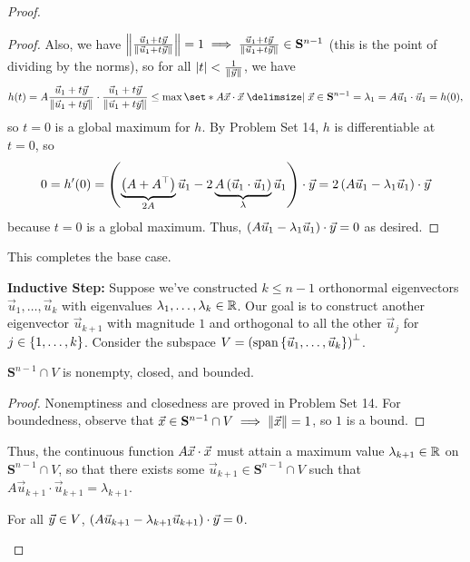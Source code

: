\documentclass[main.tex]{subfiles}
\begin{document}
\begin{proof}
\begin{proof}
        Also, we have $\left\lVert \frac{\vec{u}_1 + t\vec{y}}{\left\lVert \vec{u}_1 + t\vec{y} \right\rVert} \right\rVert = 1\implies \frac{\vec{u}_1 + t\vec{y}}{\left\lVert \vec{u}_1 + t\vec{y} \right\rVert}\in \mathbf{S}^{n - 1}$ (this is the point of dividing by the norms), so for all $\left\lvert t \right\rvert < \frac{1}{\left\lVert \vec{y} \right\rVert}$, we have
        \[h(t) = A\frac{\vec{u}_1 + t\vy}{\norm{\vec{u}_1 + t\vy}} \cdot \frac{\vec{u}_1 + t\vy}{\norm{\vec{u}_1 + t\vy}} \le \max\set*{A\vx\cdot\vx \mid \vx \in \mathbf{S}^{n - 1}} = \lambda_1 = A\vec{u}_1 \cdot \vec{u}_1 = h(0),\]
        so $t = 0$ is a global maximum for $h$. By Problem Set 14, $h$ is differentiable at $t = 0$, so
        \[0 = h'(0) = \left( \underbrace{\left( A + A^\top \right)}_{2A}\vec{u}_1 - 2\underbrace{A\left( \vec{u}_1 \cdot \vec{u}_1 \right)}_{\lambda}\vec{u}_1 \right)\cdot \vec{y} = 2\left( A\vec{u}_1 - \lambda_1\vec{u}_1 \right)\cdot \vec{y}\]
        because $t = 0$ is a global maximum. Thus, $\left( A\vec{u}_1 - \lambda_1\vec{u}_1 \right)\cdot \vec{y} = 0$ as desired.
    \end{proof}
    
    This completes the base case.

    \textbf{Inductive Step:} Suppose we've constructed $k\le n - 1$ orthonormal eigenvectors $\vec{u}_1, \ldots , \vec{u}_k$ with eigenvalues $\lambda_1, \ldots , \lambda_k\in \mathbb R$. Our goal is to construct another eigenvector $\vec{u}_{k + 1}$ with magnitude $1$ and orthogonal to all the other $\vec{u}_j$ for $j \in \left\{ 1, \ldots , k \right\}$. Consider the subspace $V = \left( \operatorname{span}\left\{ \vec{u}_1 ,\ldots , \vec{u}_k \right\} \right)^\perp$.

    \begin{claim}
        $\mathbf{S}^{n - 1} \cap V$ is nonempty, closed, and bounded.
    \end{claim}

    \begin{proof}
        Nonemptiness and closedness are proved in Problem Set 14. For boundedness, observe that $\vec{x}\in \mathbf{S}^{n - 1} \cap V \implies \left\lVert \vec{x} \right\rVert = 1$, so $1$ is a bound.
    \end{proof}

    Thus, the continuous function $A\vec{x}\cdot\vec{x}$ must attain a maximum value $\lambda_{k + 1}\in \mathbb R$ on $\mathbf{S}^{n - 1} \cap V$, so that there exists some $\vec{u}_{k + 1}\in \mathbf{S}^{n - 1} \cap V$ such that $A\vec{u}_{k + 1}\cdot\vec{u}_{k + 1} = \lambda_{k + 1}$.

    \begin{claim}
        For all $\vec{y} \in V$, $\left( A\vec{u}_{k + 1} - \lambda_{k + 1}\vec{u}_{k + 1} \right)\cdot \vec{y} = 0$.
    \end{claim}


\end{proof}
\end{document}
